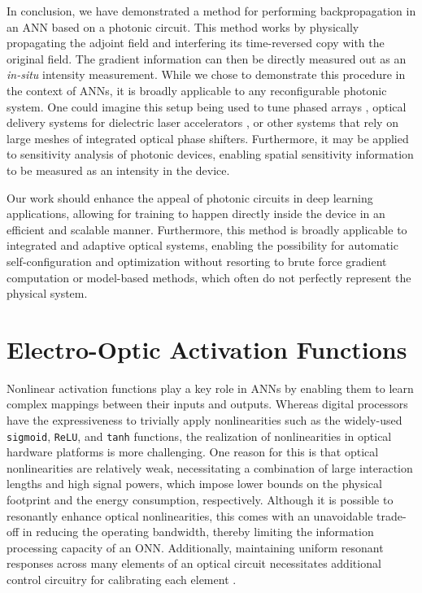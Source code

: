 
In conclusion, we have demonstrated a method for performing backpropagation in an ANN based on a photonic circuit.  This method works by physically propagating the adjoint field and interfering its time-reversed copy with the original field.  The gradient information can then be directly measured out as an \textit{in-situ} intensity measurement. While we chose to demonstrate this procedure in the context of ANNs, it is broadly applicable to any reconfigurable photonic system.  One could imagine this setup being used to tune phased arrays \cite{sun2013large}, optical delivery systems for dielectric laser accelerators \cite{hughes2017chip}, or other systems that rely on large meshes of integrated optical phase shifters.  Furthermore, it may be applied to sensitivity analysis of photonic devices, enabling spatial sensitivity information to be measured as an intensity in the device.

Our work should enhance the appeal of photonic circuits in deep learning applications, allowing for training to happen directly inside the device in an efficient and scalable manner.  Furthermore, this method is broadly applicable to integrated and adaptive optical systems, enabling the possibility for automatic self-configuration and optimization without resorting to brute force gradient computation or model-based methods, which often do not perfectly represent the physical system.

\section{Electro-Optic Activation Functions}

Nonlinear activation functions play a key role in ANNs by enabling them to learn complex mappings between their inputs and outputs. 
Whereas digital processors have the expressiveness to trivially apply nonlinearities such as the widely-used \texttt{sigmoid}, \texttt{ReLU}, and \texttt{tanh} functions, the realization of nonlinearities in optical hardware platforms is more challenging. 
One reason for this is that optical nonlinearities are relatively weak, necessitating a combination of large interaction lengths and high signal powers, which impose lower bounds on the physical footprint and the energy consumption, respectively. 
Although it is possible to resonantly enhance optical nonlinearities, this comes with an unavoidable trade-off in reducing the operating bandwidth, thereby limiting the information processing capacity of an ONN. 
Additionally, maintaining uniform resonant responses across many elements of an optical circuit necessitates additional control circuitry for calibrating each element \cite{radulaski_thermally_2018}.


